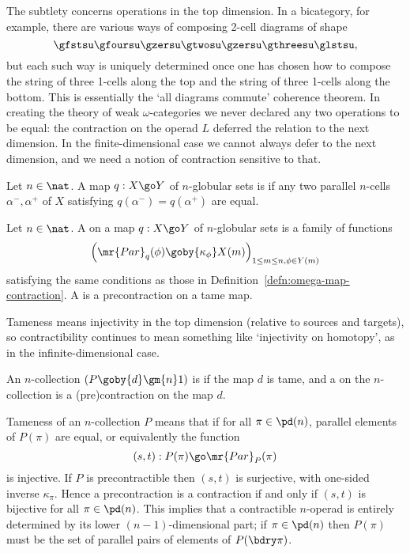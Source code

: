 The subtlety concerns operations in the top%
%
%
dimension.  In a
bicategory, for example, there are various ways of composing 2-cell
diagrams of shape
\[
\gfstsu\gfoursu\gzersu\gtwosu\gzersu\gthreesu\glstsu,
\]
but each such way is uniquely determined once one has chosen how to compose
the string of three 1-cells along the top and the string of three 1-cells
along the bottom.  This is essentially the `all diagrams commute'
coherence%
%
%
theorem.  In creating the theory of weak $\omega$-categories we never
declared any two operations to be equal: the contraction on the operad $L$
deferred the relation to the next dimension.  In the finite-dimensional
case we cannot always defer to the next dimension, and we need a notion of
contraction sensitive to that.

\begin{defn}
Let $n\in\nat$.  A map $q: X \go Y$ of $n$-globular sets is %
%
%
if
any two parallel $n$-cells $\alpha^-, \alpha^+$ of $X$ satisfying
$q(\alpha^-) = q(\alpha^+)$ are equal.
\end{defn}

\begin{defn}
Let $n\in\nat$.  A %
%
%
on a map $q: X \go Y$ of
$n$-globular sets is a family of functions
\[
\left(
\mr{Par}_q(\phi) \goby{\kappa_\phi} X(m) 
\right)_{1 \leq m \leq n, \phi\in Y(m)}
\]
satisfying the same conditions as those in
Definition~\ref{defn:omega-map-contraction}.  A  is a
precontraction on a tame map.
\end{defn}
% 
Tameness means injectivity in the top dimension (relative to sources and
targets), so contractibility continues to mean something like `injectivity%
%
%
on homotopy', as in the infinite-dimensional case.  

\begin{defn}
An $n$-collection $(P \goby{d} \gm{n}1)$ is %
%
%
if the map $d$ is
tame, and a %
%
%
%
%
on the $n$-collection is a
(pre)contraction on the map $d$.
\end{defn}
% 
Tameness of an $n$-collection $P$ means that if for all $\pi\in\pd(n)$,
parallel elements of $P(\pi)$ are equal, or equivalently the function
\[
(s,t): P(\pi) \go \mr{Par}_P(\pi)
\]
is injective.  If $P$ is precontractible then $(s,t)$ is surjective, with
one-sided inverse $\kappa_\pi$.  Hence a precontraction is a contraction if
and only if $(s,t)$ is bijective for all $\pi\in\pd(n)$.  This implies that
a contractible $n$-operad is entirely%
%
%
determined by its lower
$(n-1)$-dimensional part; if $\pi\in\pd(n)$ then $P(\pi)$ must be the set of
parallel pairs of elements of $P(\bdry\pi)$.  

